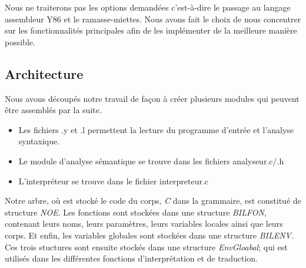 \documentclass[10pt,a4paper]{article}
\begin{document}
Nous ne traiterons pas les options demandées c'est-à-dire le passage au langage assembleur Y86 et le ramasse-miettes.
Nous avons fait le choix de nous concentrer sur les fonctionnalités principales afin de les implémenter de la meilleure manière possible.

\subsection{Architecture}
Nous avons découpés notre travail de façon à créer plusieurs modules qui peuvent être assemblés par la suite.


\begin{itemize}
    \item Les fichiers .y et .l permettent la lecture du programme d'entrée et l'analyse syntaxique.
    \item Le module d'analyse sémantique se trouve dans les fichiers analyseur.c/.h
    \item L'interpréteur se trouve dans le fichier interpreteur.c
\end{itemize}

Notre arbre, où est stocké le code du corps, \textit{C} dans la grammaire,  est constitué de structure \textit{NOE}. Les fonctions sont stockées dans une structure \textit{BILFON}, contenant leurs noms, leurs paramètres, leurs variables locales ainsi que leurs corps. Et enfin, les variables globales sont stockées dans une structure \textit{BILENV}. Ces trois stuctures sont ensuite stockés dans une structure \textit{EnvGloabal}; qui est utilisés dans les différentes fonctions d'interprétation et de traduction.
  
\end{document}
